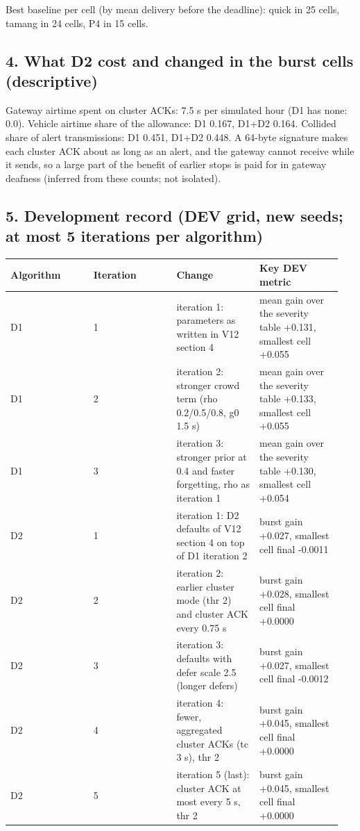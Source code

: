 Best baseline per cell (by mean delivery before the deadline): quick in 25 cells, tamang in 24 cells, P4 in 15 cells.

\subsection*{4. What D2 cost and changed in the burst cells (descriptive)}

Gateway airtime spent on cluster ACKs: 7.5 s per simulated hour (D1 has none: 0.0). Vehicle airtime share of the allowance: D1 0.167, D1+D2 0.164. Collided share of alert transmissions: D1 0.451, D1+D2 0.448. A 64-byte signature makes each cluster ACK about as long as an alert, and the gateway cannot receive while it sends, so a large part of the benefit of earlier stops is paid for in gateway deafness (inferred from these counts; not isolated).

\subsection*{5. Development record (DEV grid, new seeds; at most 5 iterations per algorithm)}

{\scriptsize\raggedright
\begin{longtable}{p{0.237\linewidth}p{0.237\linewidth}p{0.237\linewidth}p{0.237\linewidth}}
\toprule
Algorithm & Iteration & Change & Key DEV metric \\
\midrule
\endhead
D1 & 1 & iteration 1: parameters as written in V12 section 4 & mean gain over the severity table +0.131, smallest cell +0.055 \\
D1 & 2 & iteration 2: stronger crowd term (rho 0.2/0.5/0.8, g0 1.5 s) & mean gain over the severity table +0.133, smallest cell +0.055 \\
D1 & 3 & iteration 3: stronger prior at 0.4 and faster forgetting, rho as iteration 1 & mean gain over the severity table +0.130, smallest cell +0.054 \\
D2 & 1 & iteration 1: D2 defaults of V12 section 4 on top of D1 iteration 2 & burst gain +0.027, smallest cell final -0.0011 \\
D2 & 2 & iteration 2: earlier cluster mode (thr 2) and cluster ACK every 0.75 s & burst gain +0.028, smallest cell final +0.0000 \\
D2 & 3 & iteration 3: defaults with defer scale 2.5 (longer defers) & burst gain +0.027, smallest cell final -0.0012 \\
D2 & 4 & iteration 4: fewer, aggregated cluster ACKs (tc 3 s), thr 2 & burst gain +0.045, smallest cell final +0.0000 \\
D2 & 5 & iteration 5 (last): cluster ACK at most every 5 s, thr 2 & burst gain +0.045, smallest cell final +0.0000 \\
\bottomrule
\end{longtable}}


